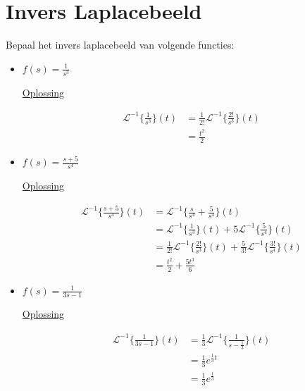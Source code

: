 \documentclass[12pt]{report}
\newcommand{\exercise}[2]{
#1


\underline{Oplossing}

#2

\hrulefill
}
\begin{document}
\section{Invers Laplacebeeld}
Bepaal het invers laplacebeeld van volgende functies:
\begin{itemize}[label={}]
 \item{
    \exercise{
        $f(s) = \frac{1}{s^3}$
    }{
        \begin{equation*}
         \begin{split}
          \mathcal{L}^{-1}\bigg\{\frac{1}{s^3}\bigg\}(t) & = \frac{1}{2!}\mathcal{L}^{-1}\bigg\{\frac{2!}{s^3}\bigg\}(t) \\
                                                         & = \frac{t^2}{2}
         \end{split}
        \end{equation*}
    }
 }
 \item{
    \exercise{
        $f(s) = \frac{s + 5}{s^4}$
    }{
        \begin{equation*}
         \begin{split}
          \mathcal{L}^{-1}\bigg\{\frac{s + 5}{s^4}\bigg\}(t) & = \mathcal{L}^{-1}\bigg\{\frac{s}{s^4} + \frac{5}{s^4}\bigg\}(t) \\
                                                             & = \mathcal{L}^{-1}\bigg\{\frac{1}{s^3}\bigg\}(t) + 5\mathcal{L}^{-1}\bigg\{\frac{5}{s^4}\bigg\}(t) \\
                                                             & = \frac{1}{2!}\mathcal{L}^{-1}\bigg\{\frac{2!}{s^3}\bigg\}(t) + \frac{5}{3!}\mathcal{L}^{-1}\bigg\{\frac{3!}{s^4}\bigg\}(t) \\
                                                             & = \frac{t^2}{2} + \frac{5t^3}{6}
         \end{split}
        \end{equation*}
    }
 }
 \item{
    \exercise{
        $f(s) = \frac{1}{3s - 1}$
    }{
        \begin{equation*}
         \begin{split}
          \mathcal{L}^{-1}\bigg\{\frac{1}{3s - 1}\bigg\}(t) & = \frac{1}{3}\mathcal{L}^{-1}\bigg\{\frac{1}{s - \frac{1}{3}}\bigg\}(t) \\
                                                            & = \frac{1}{3}e^{\frac{1}{3}t} \\
                                                            & = \frac{1}{3}e^{\frac{t}{3}}

\end{split}
\end{equation*}}}
\end{itemize}
\end{document}
